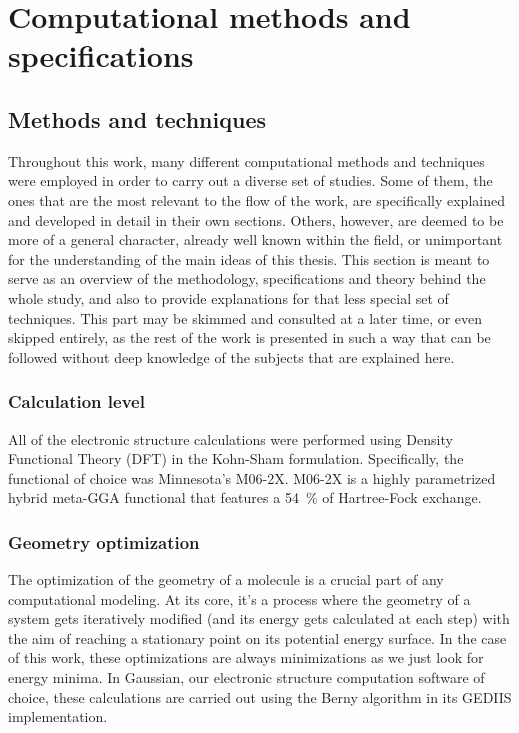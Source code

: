 \chapter{Computational methods and specifications}

\section{Methods and techniques}

Throughout this work, many different computational methods and techniques were employed in order to carry out a diverse set of studies.
Some of them, the ones that are the most relevant to the flow of the work, are specifically explained and developed in detail in their own sections.
Others, however, are deemed to be more of a general character, already well known within the field, or unimportant for the understanding of the main ideas of this thesis.
This section is meant to serve as an overview of the methodology, specifications and theory behind the whole study, and also to provide explanations for that less special set of techniques.
This part may be skimmed and consulted at a later time, or even skipped entirely, as the rest of the work is presented in such a way that can be followed without deep knowledge of the subjects that are explained here.

\subsection{Calculation level}
All of the electronic structure calculations were performed using Density Functional Theory (DFT) in the Kohn-Sham formulation.
Specifically, the functional of choice was Minnesota's M06-2X.
M06-2X is a highly parametrized hybrid meta-GGA functional that features a \SI{54}{\percent} of Hartree-Fock exchange.

\subsection{Geometry optimization}
The optimization of the geometry of a molecule is a crucial part of any computational modeling.
At its core, it's a process where the geometry of a system gets iteratively modified (and its energy gets calculated at each step) with the aim of reaching a stationary point on its potential energy surface.
In the case of this work, these optimizations are always minimizations as we just look for energy minima.
In Gaussian, our electronic structure computation software of choice, these calculations are carried out using the Berny algorithm in its GEDIIS implementation.

